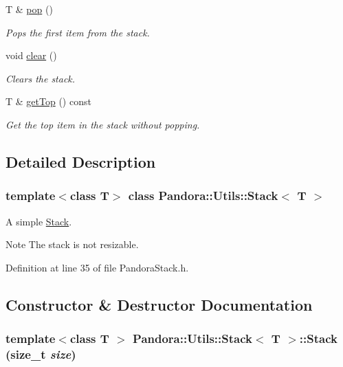 \begin{DoxyCompactItemize}
T \& \hyperlink{classPandora_1_1Utils_1_1Stack_a2ef38d630c91e48b425799887621433f}{pop} ()
\begin{DoxyCompactList}\small\item\em Pops the first item from the stack. \item\end{DoxyCompactList}\item 
void \hyperlink{classPandora_1_1Utils_1_1Stack_acbedc5107a2e03fe9a53d044efdcbabf}{clear} ()
\begin{DoxyCompactList}\small\item\em Clears the stack. \item\end{DoxyCompactList}\item 
T \& \hyperlink{classPandora_1_1Utils_1_1Stack_a9bdcdee9e004ce12b8dcfc36663d0eac}{getTop} () const 
\begin{DoxyCompactList}\small\item\em Get the top item in the stack without popping. \item\end{DoxyCompactList}\end{DoxyCompactItemize}


\subsection{Detailed Description}
\subsubsection*{template$<$class T$>$ class Pandora::Utils::Stack$<$ T $>$}

A simple \hyperlink{classPandora_1_1Utils_1_1Stack}{Stack}. \begin{DoxyNote}{Note}
The stack is not resizable. 
\end{DoxyNote}


Definition at line 35 of file PandoraStack.h.

\subsection{Constructor \& Destructor Documentation}
\hypertarget{classPandora_1_1Utils_1_1Stack_aeebc274daaf6ba9da141e53dcd818352}{
\subsubsection[{Stack}]{\setlength{\rightskip}{0pt plus 5cm}template$<$class T $>$ {\bf Pandora::Utils::Stack}$<$ T $>$::{\bf Stack} (size\_\-t {\em size})}}
\label{classPandora_1_1Utils_1_1Stack_aeebc274daaf6ba9da141e53dcd818352}


